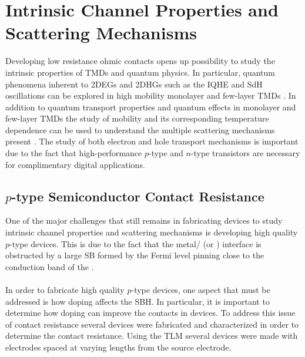 \chapter{Intrinsic Channel Properties and Scattering Mechanisms}\label{chap:results}
Developing low resistance ohmic contacts opens up possibility to study the intrinsic properties of \acp{TMD} and quantum physics. In particular, quantum phenomena inherent to \acp{2DEG} and \acp{2DHG} such as the \ac{IQHE} and \ac{SdH} oscillations can be explored in high mobility monolayer and few-layer \acp{TMD} \cite{Cui_NatureNano2015}. In addition to quantum transport properties and quantum effects in monolayer and few-layer \acp{TMD} the study of mobility and its corresponding temperature dependence can be used to understand the multiple scattering mechanisms present \cite{Kaasbjerg_PhysRevB2012}. The study of both electron and hole transport mechanisms is important due to the fact that high-performance $p$-type and $n$-type transistors are necessary for complimentary digital applications. 

\section{$p$-type  Semiconductor Contact Resistance}\label{sec:pWSe2_contacts}
One of the major challenges that still remains in fabricating devices to study intrinsic channel properties and scattering mechanisms is developing high quality $p$-type  devices. This is due to the fact that the metal/ (or ) interface is obstructed by a large \ac{SB} formed by the Fermi level pinning close to the conduction band of the  \cite{Chuang_NanoLett2014,Das_NanoLett2012}. \\ \\

\noindent In order to fabricate high quality $p$-type  devices, one aspect that must be addressed is how doping affects the \ac{SBH}. In particular, it is important to determine how doping can improve the contacts in devices. To address this issue of contact resistance several devices were fabricated and characterized in order to determine the contact resistance. Using the \ac{TLM} several  devices were made with electrodes spaced at varying lengths from the source electrode. \\ \\ 

